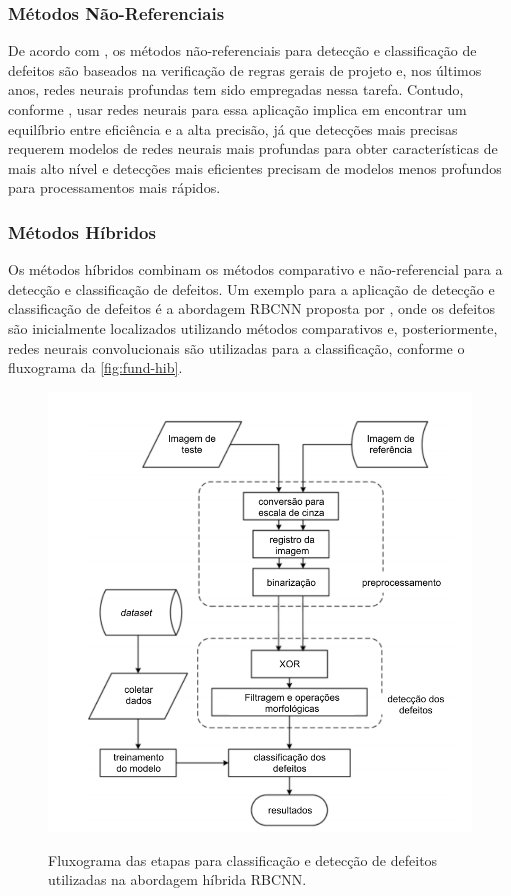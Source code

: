 \subsubsection{Métodos Não-Referenciais} \label{cap:fund-pcb-metodos-nref}
De acordo com , os métodos não-referenciais para detecção e classificação de defeitos são baseados na verificação de regras gerais de projeto e, nos últimos anos, redes neurais profundas tem sido empregadas nessa tarefa. Contudo, conforme , usar redes neurais para essa aplicação implica em encontrar um equilíbrio entre eficiência e a alta precisão, já que detecções mais precisas requerem modelos de redes neurais mais profundas para obter características de mais alto nível e detecções mais eficientes precisam de modelos menos profundos para processamentos mais rápidos.

\subsubsection{Métodos Híbridos} \label{cap:fund-pcb-metodos-hib}
Os métodos híbridos combinam os métodos comparativo e não-referencial para a detecção e classificação de defeitos. Um exemplo para a aplicação de detecção e classificação de defeitos é a abordagem RBCNN proposta por , onde os defeitos são inicialmente localizados utilizando métodos comparativos e, posteriormente, redes neurais convolucionais são utilizadas para a classificação, conforme o fluxograma da \autoref{fig:fund-hib}.

\begin{figure}[h!] %
  \centering
  \caption{Fluxograma das etapas para classificação e detecção de defeitos utilizadas na abordagem híbrida RBCNN.}
  \includegraphics[scale=0.85]{img/img-fundamentacao-hib.pdf}
  \label{fig:fund-hib}
\end{figure}

